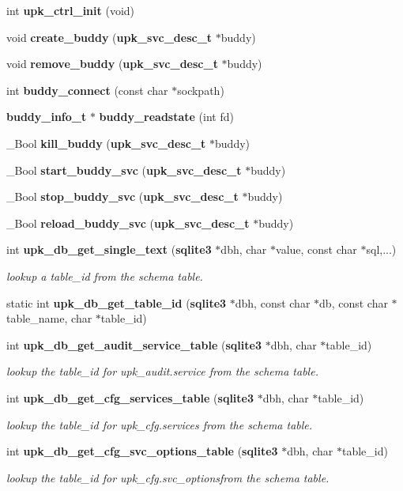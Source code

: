 \begin{DoxyCompactItemize}
int {\bf upk\_\-ctrl\_\-init} (void)
\item 
void {\bf create\_\-buddy} ({\bf upk\_\-svc\_\-desc\_\-t} $\ast$buddy)
\item 
void {\bf remove\_\-buddy} ({\bf upk\_\-svc\_\-desc\_\-t} $\ast$buddy)
\item 
int {\bf buddy\_\-connect} (const char $\ast$sockpath)
\item 
{\bf buddy\_\-info\_\-t} $\ast$ {\bf buddy\_\-readstate} (int fd)
\item 
\_\-Bool {\bf kill\_\-buddy} ({\bf upk\_\-svc\_\-desc\_\-t} $\ast$buddy)
\item 
\_\-Bool {\bf start\_\-buddy\_\-svc} ({\bf upk\_\-svc\_\-desc\_\-t} $\ast$buddy)
\item 
\_\-Bool {\bf stop\_\-buddy\_\-svc} ({\bf upk\_\-svc\_\-desc\_\-t} $\ast$buddy)
\item 
\_\-Bool {\bf reload\_\-buddy\_\-svc} ({\bf upk\_\-svc\_\-desc\_\-t} $\ast$buddy)
\item 
int {\bf upk\_\-db\_\-get\_\-single\_\-text} ({\bf sqlite3} $\ast$dbh, char $\ast$value, const char $\ast$sql,...)
\begin{DoxyCompactList}\small\item\em lookup a table\_\-id from the schema table. \end{DoxyCompactList}\item 
static int {\bf upk\_\-db\_\-get\_\-table\_\-id} ({\bf sqlite3} $\ast$dbh, const char $\ast$db, const char $\ast$table\_\-name, char $\ast$table\_\-id)
\item 
int {\bf upk\_\-db\_\-get\_\-audit\_\-service\_\-table} ({\bf sqlite3} $\ast$dbh, char $\ast$table\_\-id)
\begin{DoxyCompactList}\small\item\em lookup the table\_\-id for upk\_\-audit.service from the schema table. \end{DoxyCompactList}\item 
int {\bf upk\_\-db\_\-get\_\-cfg\_\-services\_\-table} ({\bf sqlite3} $\ast$dbh, char $\ast$table\_\-id)
\begin{DoxyCompactList}\small\item\em lookup the table\_\-id for upk\_\-cfg.services from the schema table. \end{DoxyCompactList}\item 
int {\bf upk\_\-db\_\-get\_\-cfg\_\-svc\_\-options\_\-table} ({\bf sqlite3} $\ast$dbh, char $\ast$table\_\-id)
\begin{DoxyCompactList}\small\item\em lookup the table\_\-id for upk\_\-cfg.svc\_\-optionsfrom the schema table. \end{DoxyCompactList}\item 

\end{DoxyCompactItemize}
